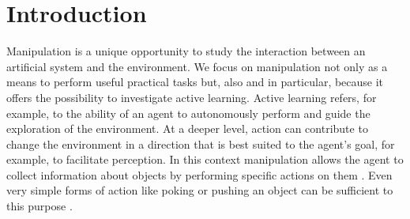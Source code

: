 \section{Introduction}
\label{sect:intro}
Manipulation is a unique opportunity to study the interaction between an artificial system and the environment. We focus on manipulation not only as a means to perform useful practical tasks but, also and in particular, because it offers the possibility to investigate active learning. Active learning refers, for example, to the ability of an agent to autonomously perform and guide the exploration of the environment. At a deeper level, action can contribute to change the environment in a direction that is best suited to the agent's goal, for example, to facilitate perception. In this context manipulation allows the agent to collect information about objects by performing specific actions on them \cite{metta03early}. Even very simple forms of action like poking or pushing an object can be sufficient to this purpose \cite{fitzpatrick03learning}.

